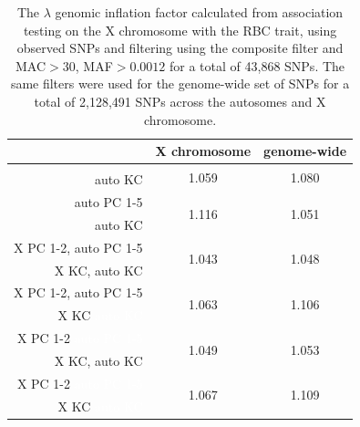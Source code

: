 \documentclass[11pt]{article} %
\begin{document}
\begin{table}[h!]
\centering
\begin{tabular}{r|cc}
  \hline
 & X chromosome & genome-wide \\ 
  \hline
& \multirow{2}{*}{1.059} & \multirow{2}{*}{1.080}\\
auto KC & & \\ \hline
auto PC 1-5 & \multirow{2}{*}{1.116} & \multirow{2}{*}{1.051} \\ 
auto KC & & \\ \hline
X PC 1-2, auto PC 1-5&\multirow{2}{*}{1.043} & \multirow{2}{*}{1.048} \\ 
X KC, auto KC & & \\ \hline
X PC 1-2, auto PC 1-5 & \multirow{2}{*}{1.063} & \multirow{2}{*}{1.106} \\
X KC \textcolor{white}{auto KC} & & \\ \hline
X PC 1-2 \textcolor{white}{auto PC 1-5}& \multirow{2}{*}{1.049} & \multirow{2}{*}{1.053} \\
X KC, auto KC & & \\ \hline
X PC 1-2 \textcolor{white}{auto PC 1-5} & \multirow{2}{*}{1.067} & \multirow{2}{*}{1.109} \\
X KC \textcolor{white}{auto KC} & & \\ \hline 
\end{tabular}
\caption{The $\lambda$ genomic inflation factor calculated from association testing on the X chromosome with the RBC trait, using observed SNPs and filtering using the composite filter and MAC$>$30, MAF$>0.0012$ for a total of 43,868 SNPs. The same filters were used for the genome-wide set of SNPs for a total of 2,128,491 SNPs across the autosomes and X chromosome.}
\label{table:lambda}
\end{table}
\end{document}
